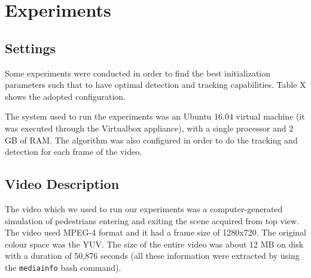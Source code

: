 \documentclass[runningheads]{llncs}
\begin{document}
\section{Experiments}

\subsection{Settings}
Some experiments were conducted in order to find the best initialization parameters such that to have optimal detection and tracking capabilities. Table X shows the adopted configuration. 

The system used to run the experiments was an Ubuntu 16.04 virtual machine (it was executed through the Virtualbox appliance), with a single processor and 2 GB of RAM. The algorithm was also configured in order to do the tracking and detection for each frame of the video.

\begin{table}[h]
\centering
\caption{Final parameters for the algorithm}
\label{table:params}
\end{table}

\subsection{Video Description}

The video which we used to run our experiments was a computer-generated simulation of pedestrians entering and exiting the scene acquired from top view. The video used MPEG-4 format and it had a frame size of 1280x720. The original colour space was the YUV. The size of the entire video was about 12 MB on disk with a duration of 50,876 seconds (all these information were extracted by using the \texttt{mediainfo} bash command).
\end{document}
